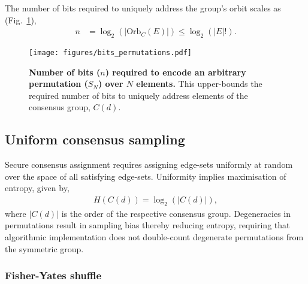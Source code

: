 \documentclass[twocolumn, aps, amsmath, amssymb, nofootinbib, superscriptaddress, longbibliography, floatfix, eqsecnum, rmp]{revtex4-2}
\begin{document}


The number of bits required to uniquely address the group's orbit scales as (Fig.~\ref{fig:bits_permutations}),
\begin{align}
	n &= \log_2(|\mathrm{Orb}_C(E)|) \leq \log_2(|E|!).
\end{align}

\begin{figure}[!htb]
	\texttt{[image: figures/bits\_permutations.pdf]}
	\caption{\textbf{Number of bits ($n$) required to encode an arbitrary permutation ($S_N$) over $N$ elements.} This upper-bounds the required number of bits to uniquely address elements of the consensus group, $C(d)$.} \label{fig:bits_permutations}
\end{figure}

\subsection{Uniform consensus sampling} \label{sec:uniform_consensus_samp}

Secure consensus assignment requires assigning edge-sets uniformly at random over the space of all satisfying edge-sets. Uniformity implies maximisation of entropy, given by,
\begin{align}
	H(C(d)) = \log_2(|C(d)|),
\end{align}
where $|C(d)|$ is the order of the respective consensus group. Degeneracies in permutations result in sampling bias thereby reducing entropy, requiring that algorithmic implementation does not double-count degenerate permutations from the symmetric group.

\subsubsection{Fisher-Yates shuffle}
\end{document}
